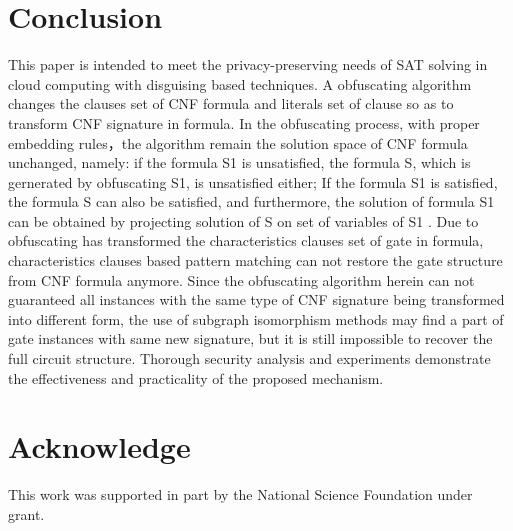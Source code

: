 \documentclass[runningheads,a4paper]{llncs}
\begin{document}
\section{Conclusion} 
This paper is intended to meet the privacy-preserving needs of SAT solving in cloud computing with disguising based techniques. A obfuscating algorithm changes the clauses set of CNF formula and literals set of clause so as to transform CNF signature in formula. In the obfuscating process, with proper embedding rules，the algorithm remain the solution space of CNF formula unchanged, namely: if the formula S1 is unsatisfied, the formula S, which is gernerated by obfuscating S1, is unsatisfied either; If the formula S1 is satisfied, the formula S can also be satisfied, and furthermore, the solution of formula S1 can be obtained by projecting solution of S  on set of variables of S1 .
Due to obfuscating has transformed the characteristics clauses set of gate in formula, characteristics clauses based pattern matching can not restore the gate structure from CNF formula anymore. Since the obfuscating algorithm herein can not guaranteed all instances with the same type of CNF signature being transformed into different form, the use of subgraph isomorphism methods may find a part of gate instances with same new signature, but it is still impossible to recover the full circuit structure. Thorough security analysis and experiments demonstrate the effectiveness and practicality of the proposed mechanism.

\section{Acknowledge} 
This work was supported in part by the National Science Foundation under grant.
\end{document}
